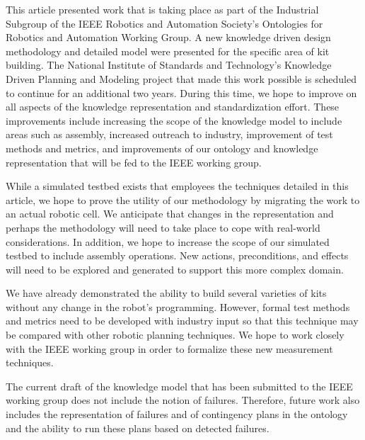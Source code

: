 This article presented work that is taking place as
part of the Industrial Subgroup of the IEEE Robotics and
Automation Society's Ontologies for Robotics and Automation Working
Group. A new knowledge driven design methodology and detailed model were
presented for the specific area of kit building.
The National Institute of Standards and Technology's
Knowledge Driven Planning and Modeling project that made
this work possible is
scheduled to continue for an additional two years. During this
time, we hope to improve on all aspects of the knowledge
representation and standardization effort. These improvements 
include increasing the scope of the knowledge model to
include areas such as assembly, increased outreach to industry, improvement of
test methods and metrics, and improvements of our ontology
and knowledge representation that will be fed to the IEEE
working group.

While a simulated testbed exists that employees the techniques
detailed in this article, we hope to prove the utility of our
methodology by migrating the work to an actual robotic cell.
We anticipate that changes in the representation and perhaps the
methodology will need to take place to cope with real-world considerations.
In addition, we hope to increase the scope of our simulated testbed to
include assembly operations. New actions, preconditions, and effects
will need to be explored and generated to support this more
complex domain.

We have already demonstrated the ability to build several varieties 
of kits without any change in the robot's programming. However, formal
test methods and metrics need to be developed with industry input so that
this technique may be compared with other robotic planning techniques. We
hope to work closely with the IEEE working group in order to formalize
these new measurement techniques.

The current draft of the knowledge model that has been submitted
to the IEEE working group does not include the notion of failures.
Therefore, future work also includes the 
representation of failures and of contingency plans in the ontology and the ability 
to run these plans based on detected failures.

